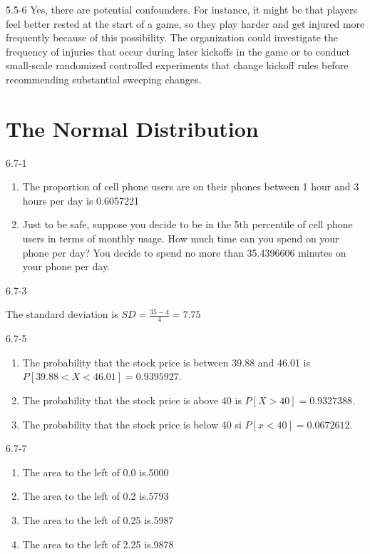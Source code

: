 \begin{exsol@solution}{5.5-6}
Yes, there are potential confounders. For instance, it might be that players feel better rested at the start of a game, so they play harder and get injured more frequently because of this possibility. The organization could investigate the frequency of injuries that occur during later kickoffs in the game or to conduct small-scale randomized controlled experiments that change kickoff rules before recommending substantial sweeping changes.

\end{exsol@solution}
\setcounter{chapter}{5}\chapter{The Normal Distribution}
\begin{exsol@solution}{6.7-1}

\begin{enumerate}
	\item The proportion of cell phone users are on their phones between 1 hour
and 3 hours per day is 0.6057221
  \item Just to be safe, suppose you decide to be in the 5th percentile of
cell phone users in terms of monthly usage.  How much time can you spend on your phone per day? You decide to spend no more than 35.4396606 minutes on your phone per day.
	\end{enumerate}
\end{exsol@solution}
\begin{exsol@solution}{6.7-3}


    The standard deviation is $SD = \frac{35 - 4}{4} = 7.75$
\end{exsol@solution}
\begin{exsol@solution}{6.7-5}

\begin{enumerate}
\item The probability that the stock price is between 39.88 and 46.01 is $P[39.88 < X < 46.01] = 0.9395927$.
\item The probability that the stock price is above 40 is $P[X > 40] = 0.9327388$.
\item The probability that the stock price is below 40 si $P[ x < 40] = 0.0672612$.
\end{enumerate}
\end{exsol@solution}
\begin{exsol@solution}{6.7-7}
\begin{enumerate}
\item The area to the left of 0.0 is.5000
\item The area to the left of 0.2 is.5793
\item The area to the left of 0.25 is.5987
\item The area to the left of 2.25 is.9878
\end{enumerate}
\end{exsol@solution}
